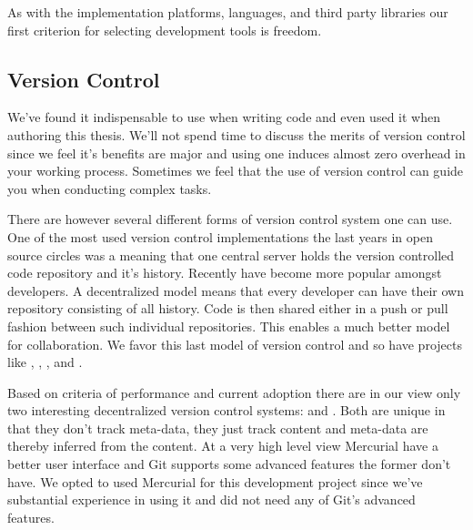 As with the implementation platforms, languages, and third party libraries
our first criterion for selecting development tools is freedom.

\subsection{Version Control}

We've found it indispensable to use  when writing code
and even used it when authoring this thesis. We'll not spend time to discuss
the merits of version control since we feel it's benefits are major and
using one induces almost zero overhead in your working process. Sometimes we
feel that the use of version control can guide you when conducting complex
tasks.

There are however several different forms of version control system one can
use. One of the most used version control implementations the last years
in open source circles was
%
\dash{}a  meaning that one central
server holds the version controlled code repository and it's history.%
Recently  have become more popular
amongst developers. A decentralized model means that every developer can have
their own repository consisting of all history.%
Code is then shared either in a push or pull fashion between such individual
repositories. This enables a much better model for collaboration.
We favor this last model of version control and so have projects
like , , ,
and .%

Based on criteria of performance and current adoption there are in our view
only two interesting decentralized version control systems:
%
and %
. Both are unique in that they don't track meta-data, they just track
content and meta-data are thereby inferred from the content.
At a very high level view Mercurial have a better user interface and Git
supports some advanced features the former don't have. We opted to used
Mercurial for this development project since we've substantial experience in
using it and did not need any of Git's advanced features.

